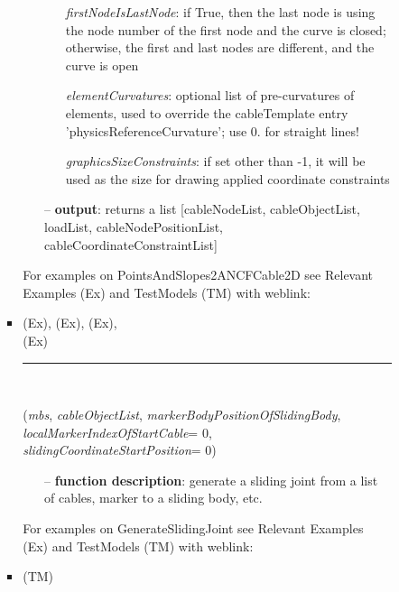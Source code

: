 \begin{itemize}[leftmargin=1.4cm]
\begin{itemize}[leftmargin=1.4cm]
\begin{itemize}[leftmargin=0.5cm]
\begin{itemize}[leftmargin=1.4cm]
\begin{itemize}[leftmargin=0.7cm]
\begin{itemize}[leftmargin=1.2cm]
\item[]{\it firstNodeIsLastNode}: if True, then the last node is using the node number of the first node and the curve is closed; otherwise, the first and last nodes are different, and the curve is open
\item[]{\it elementCurvatures}: optional list of pre-curvatures of elements, used to override the cableTemplate entry 'physicsReferenceCurvature'; use 0. for straight lines!
\item[]{\it graphicsSizeConstraints}: if set other than -1, it will be used as the size for drawing applied coordinate constraints
\end{itemize}
\item[--]{\bf output}: returns a list [cableNodeList, cableObjectList, loadList, cableNodePositionList, cableCoordinateConstraintList]
\vspace{12pt}\end{itemize}
%
%
\noindent For examples on PointsAndSlopes2ANCFCable2D see Relevant Examples (Ex) and TestModels (TM) with weblink:
\bi
 \item \footnotesize {} (Ex), 
 (Ex), 
 (Ex), 
\\  (Ex)
\ei

%
\noindent\rule{8cm}{0.75pt}\vspace{1pt} \\ 
\begin{flushleft}
\label{sec:beams:GenerateSlidingJoint}
({\it mbs}, {\it cableObjectList}, {\it markerBodyPositionOfSlidingBody}, {\it localMarkerIndexOfStartCable}= 0, {\it slidingCoordinateStartPosition}= 0)
\end{flushleft}
\setlength{\itemindent}{0.7cm}
\begin{itemize}[leftmargin=0.7cm]
\item[--]{\bf function description}: generate a sliding joint from a list of cables, marker to a sliding body, etc.
\vspace{12pt}\end{itemize}
%
%
\noindent For examples on GenerateSlidingJoint see Relevant Examples (Ex) and TestModels (TM) with weblink:
\bi
 \item \footnotesize {} (TM)
\ei


\end{itemize}
\end{itemize}
\end{itemize}
\end{itemize}
